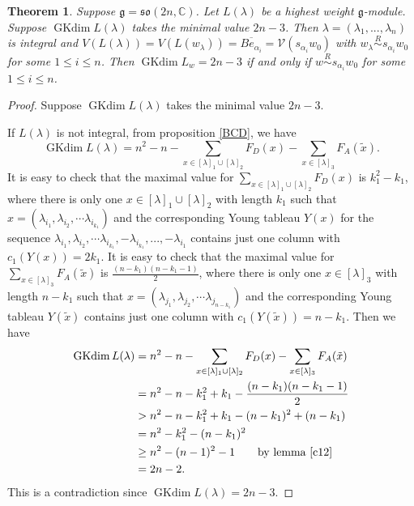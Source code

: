 \documentclass{amsart}[12pt]
\newtheorem{Thm}[Lem]{Theorem}
\newcommand{\gkd}{\operatorname{GKdim}}
\numberwithin{equation}{section}
\begin{document}
\begin{Thm}
	Suppose $\mathfrak{g}=\mathfrak{so }(2n, \mathbb{C})$. Let $L(\lambda)$ be a highest weight $\mathfrak{g}$-module. Suppose $\gkd L(\lambda)$ takes the minimal value $2n-3$. Then
	$\lambda=(\lambda_1,...,\lambda_n)$ is integral and $V(L(\lambda))=V(L(w_{\lambda}))=\overline{Be_{\alpha_i}}=\mathcal{V}(s_{\alpha_i}w_0)$ with $w_{\lambda}\stackrel{R}{\sim}s_{\alpha_{i}}w_0$ for some $1\leq i\leq n$. Then $\gkd L_w=2n-3$ if and only if   $w \stackrel{R}{\sim} s_{\alpha_{i}}w_0$  for some $1\leq i\leq n$.
\end{Thm}

\begin{proof}	Suppose $\gkd L(\lambda)$ takes the minimal value $2n-3$.
	
If $L(\lambda)$ is not integral, from proposition \ref{BCD}, we have 	\[
\gkd L(\lambda)=	n^2-n-\sum _{x\in [\lambda]_1\cup [\lambda]_2} F_D(x)-\sum _{x\in [\lambda]_3} F_A(\tilde{x}).
\]
It is easy to check that the maximal value for  $\sum\limits_{x\in [\lambda]_1\cup [\lambda]_2} F_D(x)$ is $k_1^2-k_1$, where there is only one $x \in [\lambda]_1\cup [\lambda]_2$ with length $k_1$ such that $ x=(\lambda_{i_1}, \lambda_{i_2},\cdots \lambda_{i_{k_1}})$ and the corresponding Young tableau $Y(x)$ for the sequence $\lambda_{i_1}, \lambda_{i_2},\cdots \lambda_{i_{k_1}}, -\lambda_{i_{k_1}},...,-\lambda_{i_1}$ contains just one column with
$c_1(Y(x))=2k_1$.
It is easy to check that the maximal value for $\sum\limits_{x\in [\lambda]_3} F_A(\tilde{x})$ is $\frac{(n-k_1)(n-k_1-1)}{2}$, where there is only one $x \in [\lambda]_3$ with length $n-k_1$ such that $ x=(\lambda_{j_1}, \lambda_{j_2},\cdots \lambda_{j_{n-k_1}})$ and the corresponding Young tableau $Y(\tilde{x})$  contains just one column with
$c_1(Y(\tilde{x}))=n-k_1$.
Then we have
\begin{align*}
\gkd L(\lambda)&=	n^2-n-\sum _{x\in [\lambda]_1\cup [\lambda]_2} F_D(x)-\sum _{x\in [\lambda]_3} F_A(\tilde{x})\\
&=n^2-n-k_1^2+k_1-\frac{(n-k_1)(n-k_1-1)}{2}\\
&>n^2-n-k_1^2+k_1-(n-k_1)^2+(n-k_1)\\
&=n^2-k_1^2-(n-k_1)^2\\
&\geq n^2-(n-1)^2-1 \quad \quad \text{by lemma}~ \ref{c12}\\
&=2n-2.
\end{align*}
This is a contradiction since  $\gkd L(\lambda)=2n-3$.









\end{proof}
\end{document}
